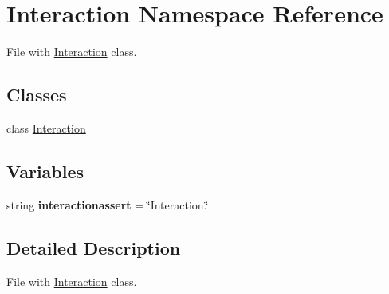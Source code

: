 \hypertarget{namespaceInteraction}{\section{\-Interaction \-Namespace \-Reference}
\label{namespaceInteraction}
}


\-File with \hyperlink{namespaceInteraction}{\-Interaction} class.  


\subsection*{\-Classes}
\begin{DoxyCompactItemize}
\item 
class \hyperlink{classInteraction_1_1Interaction}{\-Interaction}
\end{DoxyCompactItemize}
\subsection*{\-Variables}
\begin{DoxyCompactItemize}
\item 
\hypertarget{namespaceInteraction_a04a1df5923e2b51611886c109178fb52}{string {\bfseries interactionassert} = \char`\"{}\-Interaction.\char`\"{}}\label{namespaceInteraction_a04a1df5923e2b51611886c109178fb52}

\end{DoxyCompactItemize}


\subsection{\-Detailed \-Description}
\-File with \hyperlink{namespaceInteraction}{\-Interaction} class. 